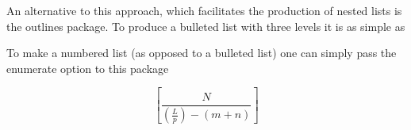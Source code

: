 An alternative to this approach, which facilitates the production of nested lists is the outlines package. To produce a bulleted list with three levels it is as simple as
% 
% 

To make a numbered list (as opposed to a bulleted list) one can simply pass the enumerate option to this package
% 
% 


\[ 
 \left[  \frac{ N } { \left( \frac{L}{p} \right)  - (m+n) }  \right]
\]

